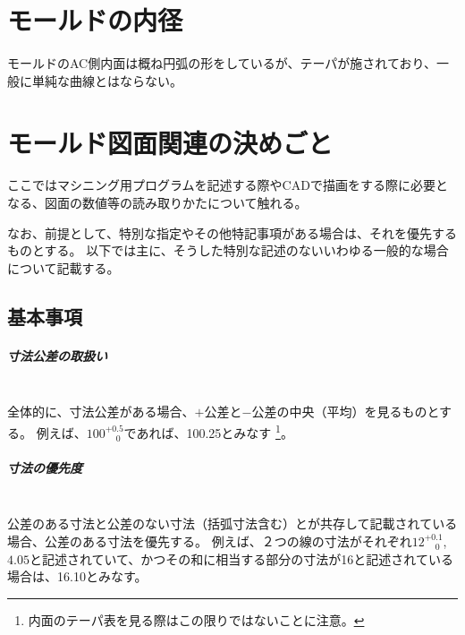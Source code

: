 \chapter{モールドの内径}
モールドのAC側内面は概ね円弧の形をしているが、テーパが施されており、一般に単純な曲線とはならない。




\chapter{モールド図面関連の決めごと}
ここではマシニング用プログラムを記述する際やCADで描画をする際に必要となる、図面の数値等の読み取りかたについて触れる。

なお、前提として、特別な指定やその他特記事項がある場合は、それを優先するものとする。
以下では主に、そうした特別な記述のないいわゆる一般的な場合について記載する。




\section{基本事項}
\paragraph{寸法公差の取扱い}　\\
全体的に、寸法公差がある場合、$+$公差と$-$公差の中央（平均）を見るものとする。
例えば、$100^{+0.5}_{\phantom -0}$であれば、100.25とみなす
\footnote{内面のテーパ表を見る際はこの限りではないことに注意。}。

\paragraph{寸法の優先度}　\\
公差のある寸法と公差のない寸法（括弧寸法含む）とが共存して記載されている場合、公差のある寸法を優先する。
例えば、２つの線の寸法がそれぞれ$12^{+0.1}_{\phantom -0}$, $4.05$と記述されていて、かつその和に相当する部分の寸法が16と記述されている場合は、16.10とみなす。




